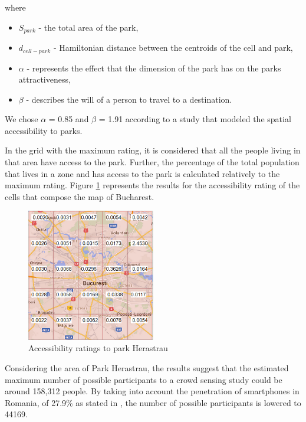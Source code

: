 where

\begin{itemize}
\item \( S_{park} \) - the total area of the park,
\item \(d_{cell-park}\) - Hamiltonian distance between the centroids of the cell and park,
\item \(\alpha\) - represents the effect that the dimension of the park has on the parks attractiveness,
\item \(\beta\) - describes the will of a person to travel to a destination.
\end{itemize}

We chose \(\alpha\) = 0.85 and \(\beta\) = 1.91 according to a study \cite{zhang2011modeling} that modeled the spatial accessibility to parks.

In the grid with the maximum rating, it is considered that all the people living in that area have access to the park. Further, the percentage of the total population that lives in a zone and has access to the park is calculated relatively to the maximum rating. Figure \ref{fig:access} represents the results for the accessibility rating of the cells that compose the map of Bucharest.

\begin{figure}
    \centering
    \includegraphics[width=0.5\textwidth]{src/img/Bucharest-Rating.png}
    \caption{Accessibility ratings to park Herastrau}
    \label{fig:access}
\end{figure}

Considering the area of Park Herastrau, the results suggest that the estimated maximum number of possible participants to a crowd sensing study could be around 158,312 people. By taking into account the penetration of smartphones in Romania, of 27.9\% as stated in \cite{poushter2016smartphone}, the number of possible participants is lowered to 44169.

